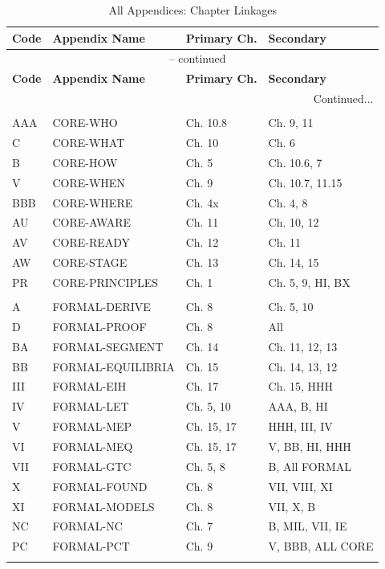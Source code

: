 \begin{longtable}{@{}llll@{}}
\caption{All Appendices: Chapter Linkages} 
\label{tab:all-chapter-mapping} \\
\toprule
\textbf{Code} & \textbf{Appendix Name} & \textbf{Primary Ch.} & \textbf{Secondary} \\
\midrule
\endfirsthead
\multicolumn{4}{c}{\tablename\ \thetable{} -- continued} \\
\toprule
\textbf{Code} & \textbf{Appendix Name} & \textbf{Primary Ch.} & \textbf{Secondary} \\
\midrule
\endhead
\midrule
\multicolumn{4}{r}{Continued...} \\
\endfoot
\bottomrule
\endlastfoot

\multicolumn{4}{@{}l}{\textit{\textbf{CORE (8)}}} \\
AAA & CORE-WHO & Ch. 10.8 & Ch. 9, 11 \\
C & CORE-WHAT & Ch. 10 & Ch. 6 \\
B & CORE-HOW & Ch. 5 & Ch. 10.6, 7 \\
V & CORE-WHEN & Ch. 9 & Ch. 10.7, 11.15 \\
BBB & CORE-WHERE & Ch. 4x & Ch. 4, 8 \\
AU & CORE-AWARE & Ch. 11 & Ch. 10, 12 \\
AV & CORE-READY & Ch. 12 & Ch. 11 \\
AW & CORE-STAGE & Ch. 13 & Ch. 14, 15 \\
PR & CORE-PRINCIPLES & Ch. 1 & Ch. 5, 9, HI, BX \\
\addlinespace

\multicolumn{4}{@{}l}{\textit{\textbf{FORMAL (12)}}} \\
A & FORMAL-DERIVE & Ch. 8 & Ch. 5, 10 \\
D & FORMAL-PROOF & Ch. 8 & All \\
BA & FORMAL-SEGMENT & Ch. 14 & Ch. 11, 12, 13 \\
BB & FORMAL-EQUILIBRIA & Ch. 15 & Ch. 14, 13, 12 \\
III & FORMAL-EIH & Ch. 17 & Ch. 15, HHH \\
IV & FORMAL-LET & Ch. 5, 10 & AAA, B, HI \\
V & FORMAL-MEP & Ch. 15, 17 & HHH, III, IV \\
VI & FORMAL-MEQ & Ch. 15, 17 & V, BB, HI, HHH \\
VII & FORMAL-GTC & Ch. 5, 8 & B, All FORMAL \\
X & FORMAL-FOUND & Ch. 8 & VII, VIII, XI \\
XI & FORMAL-MODELS & Ch. 8 & VII, X, B \\
NC & FORMAL-NC & Ch. 7 & B, MIL, VII, IE \\
PC & FORMAL-PCT & Ch. 9 & V, BBB, ALL CORE \\
\addlinespace


\end{longtable}

